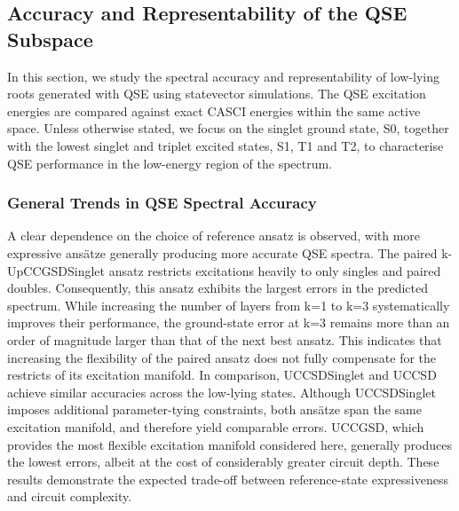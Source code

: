 \subsection{Accuracy and Representability of the QSE Subspace}
In this section, we study the spectral accuracy and representability of low-lying roots generated with QSE using statevector simulations. The QSE excitation energies are compared against exact CASCI energies within the same active space. Unless otherwise stated, we focus on the singlet ground state, S0, together with the lowest singlet and triplet excited states, S1, T1 and T2, to characterise QSE performance in the low-energy region of the spectrum.

\subsubsection{General Trends in QSE Spectral Accuracy}


A clear dependence on the choice of reference ansatz is observed, with more expressive ansätze generally producing more accurate QSE spectra. The paired k-UpCCGSDSinglet ansatz restricts excitations heavily to only singles and paired doubles. Consequently, this ansatz exhibits the largest errors in the predicted spectrum. While increasing the number of layers from k=1 to k=3 systematically improves their performance, the ground-state error at k=3 remains more than an order of magnitude larger than that of the next best ansatz. This indicates that increasing the flexibility of the paired ansatz does not fully compensate for the restricts of its excitation manifold.
In comparison, UCCSDSinglet and UCCSD achieve similar accuracies across the low-lying states. Although UCCSDSinglet imposes additional parameter-tying constraints, both ansätze span the same excitation manifold, and therefore yield comparable errors.
UCCGSD, which provides the most flexible excitation manifold considered here, generally produces the lowest errors, albeit at the cost of considerably greater circuit depth. 
These results demonstrate the expected trade-off between reference-state expressiveness and circuit complexity.

